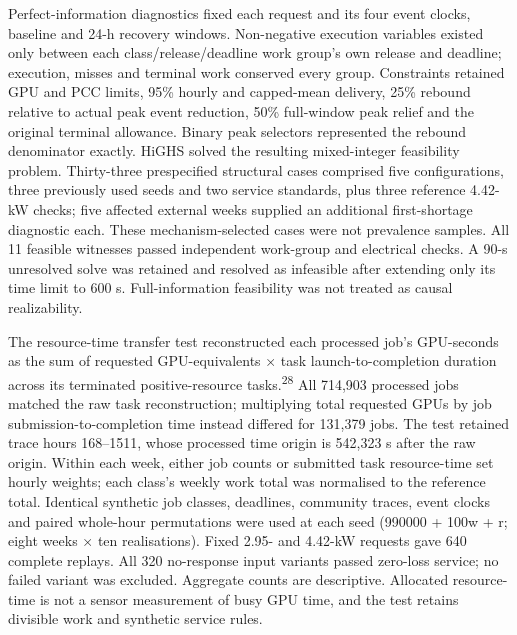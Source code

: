 \documentclass[10pt,a4paper]{article}
\begin{document}
Perfect-information diagnostics fixed each request and its four event clocks, baseline and 24-h recovery windows. Non-negative execution variables existed only between each class/release/deadline work group’s own release and deadline; execution, misses and terminal work conserved every group. Constraints retained GPU and PCC limits, 95\% hourly and capped-mean delivery, 25\% rebound relative to actual peak event reduction, 50\% full-window peak relief and the original terminal allowance. Binary peak selectors represented the rebound denominator exactly. HiGHS solved the resulting mixed-integer feasibility problem. Thirty-three prespecified structural cases comprised five configurations, three previously used seeds and two service standards, plus three reference 4.42-kW checks; five affected external weeks supplied an additional first-shortage diagnostic each. These mechanism-selected cases were not prevalence samples. All 11 feasible witnesses passed independent work-group and electrical checks. A 90-s unresolved solve was retained and resolved as infeasible after extending only its time limit to 600 s. Full-information feasibility was not treated as causal realizability.


The resource-time transfer test reconstructed each processed job’s GPU-seconds as the sum of requested GPU-equivalents × task launch-to-completion duration across its terminated positive-resource tasks.\textsuperscript{28} All 714,903 processed jobs matched the raw task reconstruction; multiplying total requested GPUs by job submission-to-completion time instead differed for 131,379 jobs. The test retained trace hours 168–1511, whose processed time origin is 542,323 s after the raw origin. Within each week, either job counts or submitted task resource-time set hourly weights; each class’s weekly work total was normalised to the reference total. Identical synthetic job classes, deadlines, community traces, event clocks and paired whole-hour permutations were used at each seed (990000 + 100w + r; eight weeks × ten realisations). Fixed 2.95- and 4.42-kW requests gave 640 complete replays. All 320 no-response input variants passed zero-loss service; no failed variant was excluded. Aggregate counts are descriptive. Allocated resource-time is not a sensor measurement of busy GPU time, and the test retains divisible work and synthetic service rules.
\end{document}
